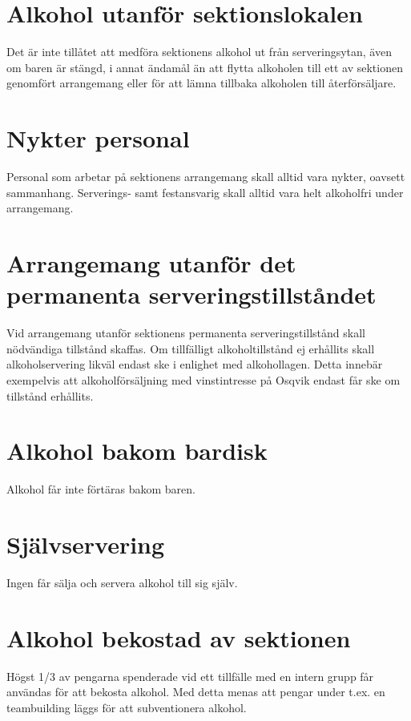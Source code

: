 \documentclass{dgovdoc}
\begin{document}
\section{Alkohol utanför sektionslokalen}

Det är inte tillåtet att medföra sektionens alkohol ut från serveringsytan,
även om baren är stängd, i annat ändamål än att flytta alkoholen till ett av
sektionen genomfört arrangemang eller för att lämna tillbaka alkoholen till
återförsäljare.

\section{Nykter personal}

Personal som arbetar på sektionens arrangemang skall alltid vara nykter,
oavsett sammanhang. Serverings- samt festansvarig skall alltid vara helt
alkoholfri under arrangemang.

\section{Arrangemang utanför det permanenta serveringstillståndet}

Vid arrangemang utanför sektionens permanenta serveringstillstånd skall
nödvändiga tillstånd skaffas. Om tillfälligt alkoholtillstånd ej erhållits
skall alkoholservering likväl endast ske i enlighet med alkohollagen. Detta
innebär exempelvis att alkoholförsäljning med vinstintresse på Osqvik endast
får ske om tillstånd erhållits.

\section{Alkohol bakom bardisk}

Alkohol får inte förtäras bakom baren.

\section{Självservering}

Ingen får sälja och servera alkohol till sig själv.

\section{Alkohol bekostad av sektionen}

Högst 1/3 av pengarna spenderade vid ett tillfälle med en intern grupp får användas för att bekosta alkohol. Med detta menas att pengar under t.ex. en teambuilding läggs för att subventionera alkohol. 
\end{document}
